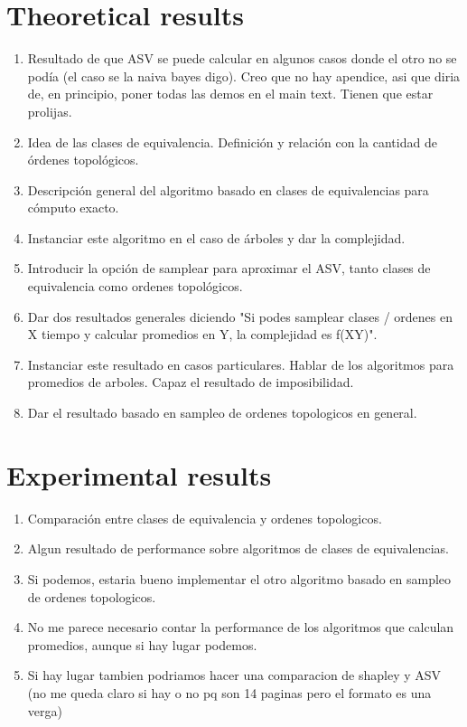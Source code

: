 \documentclass{llncs}
\begin{document}
\section{Theoretical results}

\begin{enumerate}
    \item Resultado de que ASV se puede calcular en algunos casos donde el otro no se podía (el caso se la naiva bayes digo). Creo que no hay apendice, asi que diria de, en principio, poner todas 
    las demos en el main text. Tienen que estar prolijas.
    \item Idea de las clases de equivalencia. Definición y relación con la cantidad de órdenes topológicos.
    \item Descripción general del algoritmo basado en clases de equivalencias para cómputo exacto.
    \item Instanciar este algoritmo en el caso de árboles y dar la complejidad.
    \item Introducir la opción de samplear para aproximar el ASV, tanto clases de equivalencia como ordenes topológicos.
    \item Dar dos resultados generales diciendo "Si podes samplear clases / ordenes en X tiempo y calcular promedios en Y, la complejidad es f(XY)".
    \item Instanciar este resultado en casos particulares. Hablar de los algoritmos para promedios de arboles. Capaz el resultado de imposibilidad.
    \item Dar el resultado basado en sampleo de ordenes topologicos en general.
\end{enumerate}

\section{Experimental results}

\begin{enumerate}
    \item Comparación entre clases de equivalencia y ordenes topologicos.
    \item Algun resultado de performance sobre algoritmos de clases de equivalencias. 
    \item Si podemos, estaria bueno implementar el otro algoritmo basado en sampleo de ordenes topologicos.
    \item No me parece necesario contar la performance de los algoritmos que calculan promedios, aunque si hay lugar podemos.
    \item Si hay lugar tambien podriamos hacer una comparacion de shapley y ASV (no me queda claro si hay o no pq son 14 paginas pero el formato es una verga)
\end{enumerate}
\end{document}
